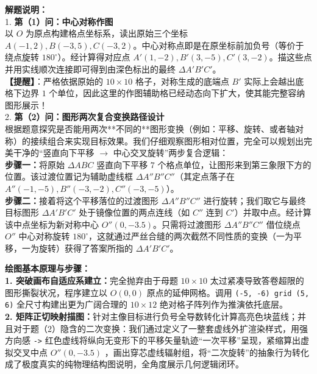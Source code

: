\documentclass[12pt, a4paper]{ctexrep}
\begin{document}
{\small\color{gray}
\textbf{解题说明：}\\
1. \textbf{第（1）问：中心对称作图}\\
以 $O$ 为原点构建格点坐标系，读出原始三个坐标 $A(-1,2), B(-3,5), C(-3,2)$。中心对称点即是在原坐标前加负号（等价于绕点旋转 $180^\circ$）。经计算得对应点 $A'(1,-2), B'(3,-5), C'(3,-2)$。描这些点并用实线顺次连接即可得到由深色标出的最终 $\Delta A'B'C'$。\\
\textbf{【提醒】}：严格依据原始的 $10\times10$ 格子，对称生成的底端点 $B'$ 实际上会越出底格下边界 $1$ 个单位，因此这里的作图辅助格已经动态向下扩大，使其能完整容纳图形展示！\\
2. \textbf{第（2）问：图形两次复合变换路径设计}\\
根据题意探究是否能用两次**不同的**图形变换（例如：平移、旋转、或者轴对称）的接续组合来实现目标效果。我们仔细观察图形相对位置，完全可以规划出完美干净的“竖直向下平移 $\rightarrow$ 中心交叉旋转”两步复合逻辑：\\
\textbf{步骤一：}将原始 $\Delta ABC$ 竖直向下平移 $7$ 个格点单位，让图形来到第三象限下方的位置。该过渡位置记为辅助虚线框 $\Delta A''B''C''$（其定点落子在 $A''(-1,-5), B''(-3,-2), C''(-3,-5)$）。\\
\textbf{步骤二：}接着将这个平移落位的过渡图形 $\Delta A''B''C''$ 进行旋转；我们取它与最终目标图形 $\Delta A'B'C'$ 处于镜像位置的两点连线（如 $C''$ 连到 $C'$）并取中点。经计算该中点坐标为新对称中心 $O''(0, -3.5)$。只需将过渡图形 $\Delta A''B''C''$ 借位绕点 $O''$ 中心对称旋转 $180^\circ$，这就通过严丝合缝的两次截然不同性质的变换（一为平移，一为旋转）获得了答案所指的 $\Delta A'B'C'$。
}

\vspace{0.6cm}

{\small\color{blue!70!black}
\textbf{绘图基本原理与步骤：}\\
\textbf{1. 突破画布自适应系建立：}完全抛弃由于母题 $10\times10$ 太过紧凑导致答卷超限的图形撕裂状况，程序建立以 $O(0,0)$ 原点的延伸网格。调用 \texttt{(-5, -6) grid (5, 6)} 全尺寸构建出更为广阔合理的 $10\times12$ 绝对格子阵列作为推演依托底层。\\
\textbf{2. 矩阵正切映射描图：}针对主像目标进行负号全导数转化计算高亮色块蓝线；并且对于题（2）隐含的二次变换：我们通过定义了一整套虚线外扩渲染样式，用强方向感 \texttt{->} 红色虚线将纵向无变形下的平移矢量轨迹“一次平移”呈现，紧缩算出虚拟交叉中点 $O''(0, -3.5)$ ，画出穿芯虚线辐射组，将“二次旋转”的抽象行为转化成了极度真实的纯物理结构图说明，全角度展示几何逻辑闭环。
}
\end{document}
